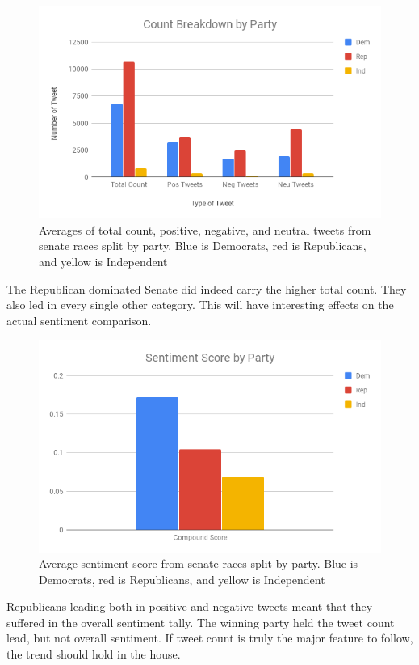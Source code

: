 \documentclass[11pt, twoside, reqno]{book}
\begin{document}
\begin{figure}[H]
\centering
	\includegraphics[scale=0.5]{count_party_senate}
	\caption{Averages of total count, positive, negative, and neutral tweets from senate races split by party. Blue is Democrats, red is Republicans, and yellow is Independent}\label{fig:count_party_senate}	
\end{figure}

The Republican dominated Senate did indeed carry the higher total count. They also led in every single other category. This will have interesting effects on the actual sentiment comparison.

\begin{figure}[H]
\centering
	\includegraphics[scale=0.5]{party_sent}
	\caption{Average sentiment score from senate races split by party. Blue is Democrats, red is Republicans, and yellow is Independent}\label{fig:party_sent}
\end{figure}

Republicans leading both in positive and negative tweets meant that they suffered in the overall sentiment tally. The winning party held the tweet count lead, but not overall sentiment. If tweet count is truly the major feature to follow, the trend should hold in the house.
\end{document}
